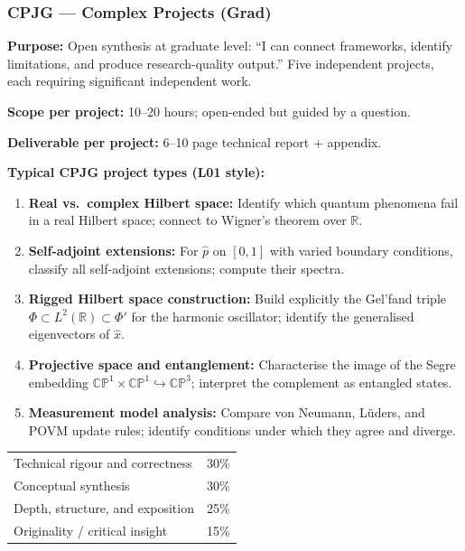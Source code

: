 \documentclass[11pt,a4paper]{article}
\begin{document}
\bigskip
\subsubsection{CPJG --- Complex Projects (Grad)}

\begin{tcolorbox}[gradprobbox, title={CPJG --- Complex Projects, Graduate \hfill\normalfont 5 projects}]

\textbf{Purpose:} Open synthesis at graduate level: ``I can connect frameworks, identify
limitations, and produce research-quality output.''
Five independent projects, each requiring significant independent work.

\medskip\textbf{Scope per project:} 10--20 hours; open-ended but guided by a question.

\medskip\textbf{Deliverable per project:} 6--10 page technical report + appendix.

\medskip\textbf{Typical CPJG project types (L01 style):}
\begin{enumerate}[leftmargin=2em,itemsep=4pt]
  \item \textbf{Real vs.\ complex Hilbert space:} Identify which quantum phenomena
        fail in a real Hilbert space; connect to Wigner's theorem over $\mathbb{R}$.
  \item \textbf{Self-adjoint extensions:} For $\hat{p}$ on $[0,1]$ with varied boundary
        conditions, classify all self-adjoint extensions; compute their spectra.
  \item \textbf{Rigged Hilbert space construction:} Build explicitly the Gel'fand triple
        $\Phi\subset L^2(\mathbb{R})\subset\Phi'$ for the harmonic oscillator; identify
        the generalised eigenvectors of $\hat{x}$.
  \item \textbf{Projective space and entanglement:} Characterise the image of the
        Segre embedding $\mathbb{CP}^1\times\mathbb{CP}^1\hookrightarrow\mathbb{CP}^3$;
        interpret the complement as entangled states.
  \item \textbf{Measurement model analysis:} Compare von Neumann, L\"uders, and
        POVM update rules; identify conditions under which they agree and diverge.
\end{enumerate}
\end{tcolorbox}

\begin{tcolorbox}[rubricbox, title={CPJG Rubric (per project)}]
\begin{tabular}{ll}
  Technical rigour and correctness  & 30\%\\
  Conceptual synthesis              & 30\%\\
  Depth, structure, and exposition  & 25\%\\
  Originality / critical insight    & 15\%\\
\end{tabular}
\end{tcolorbox}
\end{document}

